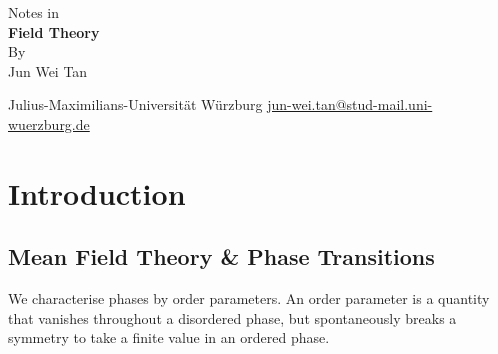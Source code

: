 \documentclass[twoside,symmetric, openany, 12pt]{./tuftebook}
\theoremstyle{definition}
\theoremstyle{definition}
\theoremstyle{definition}
\begin{document}
	\begin{titlepage}
		{\begingroup%
			\centering
			{\Large Notes in}\\[\baselineskip]
			{\Huge\bfseries Field Theory}\\[\baselineskip]
			{\LARGE By}\\[\baselineskip]
			{\LARGE Jun Wei Tan}\par
			\vfill
			{Julius-Maximilians-Universit\"{a}t W\"{u}rzburg}
			\vfill
			{\small\sffamily \href{mailto:jun-wei.tan@stud-mail.uni-wuerzburg.de}{jun-wei.tan@stud-mail.uni-wuerzburg.de}}\par
			\endgroup}
	\end{titlepage}
	\restoregeometry
	\tableofcontents

	\chapter{Introduction}
	\section{Mean Field Theory \& Phase Transitions}
	We characterise phases by order parameters. An order parameter is a quantity that vanishes throughout a disordered phase, but spontaneously breaks a symmetry to take a finite value in an ordered phase. 
\end{document}
